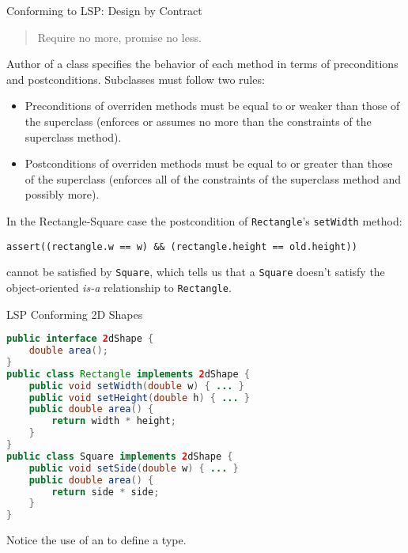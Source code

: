 \documentclass{beamer}
\begin{document}
\begin{frame}[fragile]{Conforming to LSP: Design by Contract}


\begin{quote}
Require no more, promise no less.
\end{quote}

Author of a class specifies the behavior of each method in terms of preconditions and postconditions.  Subclasses must follow two rules:
\begin{itemize}
\item Preconditions of overriden methods must be equal to or weaker than those of the superclass (enforces or assumes no more than the constraints of the superclass method).
\item Postconditions of overriden methods must be equal to or greater than those of the superclass (enforces all of the constraints of the superclass method and possibly more).
\end{itemize}

In the Rectangle-Square case the postcondition of {\tt Rectangle}'s {\tt setWidth} method:
\begin{lstlisting}
assert((rectangle.w == w) && (rectangle.height == old.height))
\end{lstlisting}
cannot be satisfied by {\tt Square}, which tells us that a {\tt Square} doesn't satisfy the object-oriented {\it is-a} relationship to {\tt Rectangle}.

\end{frame}

\begin{frame}[fragile]{LSP Conforming 2D Shapes}

\begin{lstlisting}[language=Java]
public interface 2dShape {
    double area();
}
public class Rectangle implements 2dShape {
    public void setWidth(double w) { ... }
    public void setHeight(double h) { ... }
    public double area() {
        return width * height;
    }
}
public class Square implements 2dShape {
    public void setSide(double w) { ... }
    public double area() {
        return side * side;
    }
}
\end{lstlisting}

Notice the use of an  to define a type.

\end{frame}
\end{document}
